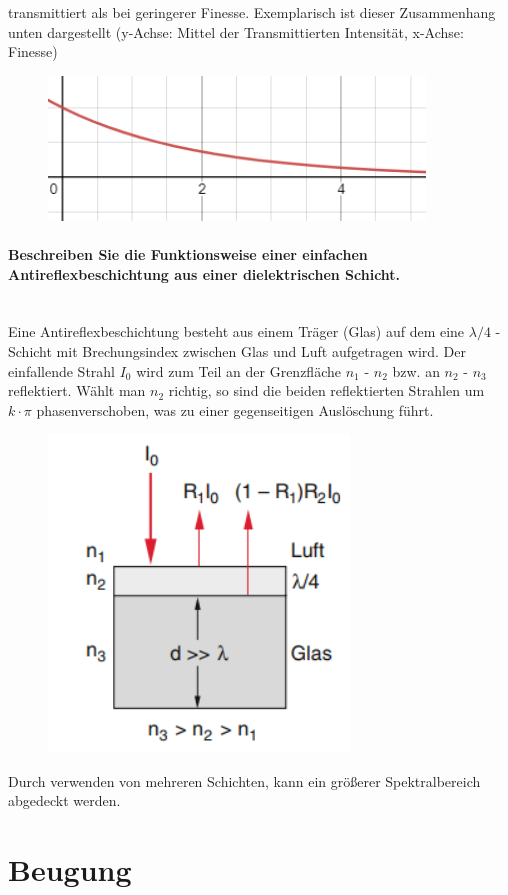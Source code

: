\documentclass[a4paper, 11pt, ngerman, parskip=half-]{scrartcl}
\newcommand{\myparagraph}[1]{\paragraph{#1}\mbox{}\\}
\begin{document}
transmittiert als bei geringerer Finesse. Exemplarisch ist dieser Zusammenhang unten dargestellt (y-Achse: Mittel der Transmittierten Intensität, x-Achse: Finesse)
\begin{figure}[H]
    \centering
    \includegraphics[width=10cm]{image/18_Interferenz/Finesse_gegen_Transmission.png}
\end{figure} 

\myparagraph{Beschreiben Sie die Funktionsweise einer einfachen Antireflexbeschichtung aus einer
dielektrischen Schicht.}
Eine Antireflexbeschichtung besteht aus einem Träger (Glas) auf dem eine $\lambda/4$ - Schicht mit Brechungsindex zwischen Glas und Luft aufgetragen wird. Der einfallende Strahl
$I_0$ wird zum Teil an der Grenzfläche $n_1$ - $n_2$ bzw. an $n_2$ - $n_3$ reflektiert. Wählt man $n_2$ richtig, so sind die beiden reflektierten Strahlen um $k \cdot \pi$ phasenverschoben,
was zu einer gegenseitigen Auslöschung führt. 
\begin{figure}[H]
    \centering
    \includegraphics[width=8cm]{image/18_Interferenz/Antireflexionsbeschichtung.png}
\end{figure} 
Durch verwenden von mehreren Schichten, kann ein größerer Spektralbereich abgedeckt werden. 
\newpage

\section{Beugung}
\label{Beugung}
\end{document}
